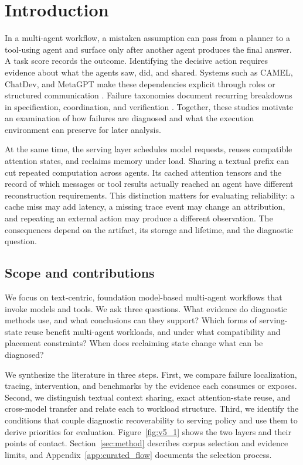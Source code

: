\documentclass[preprint,12pt]{elsarticle}
\begin{document}
\section{Introduction}\label{sec:introduction}
In a multi-agent workflow, a mistaken assumption can pass from a planner to a tool-using agent and surface only after another agent produces the final answer. A task score records the outcome. Identifying the decisive action requires evidence about what the agents saw, did, and shared. Systems such as CAMEL, ChatDev, and MetaGPT make these dependencies explicit through roles or structured communication \cite{v5ref15,v5ref30,v5ref13,v5ref7}. Failure taxonomies document recurring breakdowns in specification, coordination, and verification \cite{v5ref5}. Together, these studies motivate an examination of how failures are diagnosed and what the execution environment can preserve for later analysis.

At the same time, the serving layer schedules model requests, reuses compatible attention states, and reclaims memory under load. Sharing a textual prefix can cut repeated computation across agents. Its cached attention tensors and the record of which messages or tool results actually reached an agent have different reconstruction requirements. This distinction matters for evaluating reliability: a cache miss may add latency, a missing trace event may change an attribution, and repeating an external action may produce a different observation. The consequences depend on the artifact, its storage and lifetime, and the diagnostic question.

\subsection{Scope and contributions}
We focus on text-centric, foundation model-based multi-agent workflows that invoke models and tools. We ask three questions. What evidence do diagnostic methods use, and what conclusions can they support? Which forms of serving-state reuse benefit multi-agent workloads, and under what compatibility and placement constraints? When does reclaiming state change what can be diagnosed?

We synthesize the literature in three steps. First, we compare failure localization, tracing, intervention, and benchmarks by the evidence each consumes or exposes. Second, we distinguish textual context sharing, exact attention-state reuse, and cross-model transfer and relate each to workload structure. Third, we identify the conditions that couple diagnostic recoverability to serving policy and use them to derive priorities for evaluation. Figure~\ref{fig:v5_1} shows the two layers and their points of contact. Section~\ref{sec:method} describes corpus selection and evidence limits, and Appendix~\ref{app:curated_flow} documents the selection process.
\end{document}
